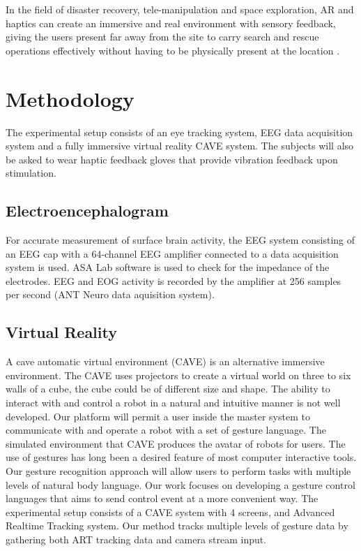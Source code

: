 \documentclass[]{article}
\begin{document}
  In the field of disaster recovery, tele-manipulation and space exploration, AR and haptics can create an immersive and real environment with sensory feedback, giving the users present far away from the site to carry search and rescue operations effectively without having to be physically present at the location \cite{mollet2009virtual}.

\section{Methodology}

The experimental setup consists of an eye tracking system, EEG data acquisition system and a fully immersive virtual reality CAVE system. The subjects will also be asked to wear haptic feedback gloves that provide vibration feedback upon stimulation.

\subsection{Electroencephalogram}
For accurate measurement of surface brain activity, the EEG system consisting of an EEG cap with a 64-channel EEG amplifier connected to a data acquisition system is used. ASA Lab software is used to check for the impedance of the electrodes. EEG and EOG activity is recorded by the amplifier at 256 samples per second (ANT Neuro data aquisition system). 

\subsection{Virtual Reality}
A cave automatic virtual environment (CAVE) is an alternative immersive environment. The CAVE uses projectors to create a virtual world on three to six walls of a cube, the cube could be of different size and shape. The ability to interact with and control a robot in a natural and intuitive manner is not well developed. Our platform will permit a user inside the master system to communicate with and operate a robot with a set of gesture language. The simulated environment that CAVE produces the avatar of robots for users. The use of gestures has long been a desired feature of most computer interactive tools. Our gesture recognition approach will allow users to perform tasks with multiple levels of natural body language. Our work focuses on developing a gesture control languages that aims to send control event at a more convenient way. The experimental setup consists of a CAVE system with 4 screens, and Advanced Realtime Tracking system. Our method tracks multiple levels of gesture data by gathering both ART tracking data and camera stream input. 
\end{document}
